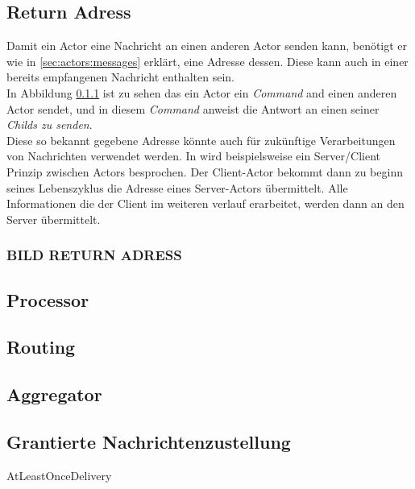 
\subsection{Return Adress}
Damit ein Actor eine Nachricht an einen anderen Actor senden kann, benötigt er wie in \ref{sec:actors:messages} erklärt, eine Adresse dessen. Diese kann auch in einer bereits empfangenen Nachricht enthalten sein. \\
In Abbildung \ref{fig:actor:patterns:returnAdress} ist zu sehen das ein Actor ein \textit{Command} and einen anderen Actor sendet, und in diesem \textit{Command} anweist die Antwort an einen seiner \textit{Childs zu senden}. \\
Diese so bekannt gegebene Adresse könnte auch für zukünftige Verarbeitungen von Nachrichten verwendet werden. In \cite{Vernon2015ReactiveAkka} wird beispielsweise ein Server/Client Prinzip zwischen Actors besprochen. Der Client-Actor bekommt dann zu beginn seines Lebenszyklus die Adresse eines Server-Actors übermittelt. Alle Informationen die der Client im weiteren verlauf erarbeitet, werden dann an den Server übermittelt.
\subsubsection{BILD RETURN ADRESS}\label{fig:actor:patterns:returnAdress}

\subsection{Processor}


\subsection{Routing}

\subsection{Aggregator}

\subsection{Grantierte Nachrichtenzustellung}
AtLeastOnceDelivery




